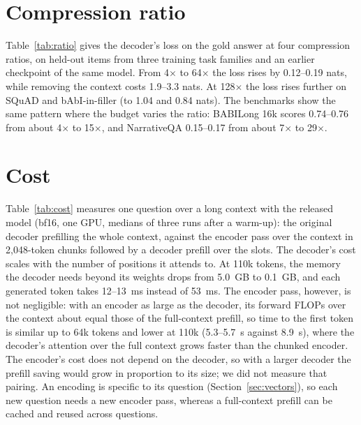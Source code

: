 \documentclass[11pt]{article}
\begin{document}
\begin{table}[!ht]
\centering
\small
\resizebox{\linewidth}{!}{}
\caption{Encoder conditions, same items and checkpoint as Table~\ref{tab:ratio}. EM: exact match of
generated answers at 64$\times$. $\mathcal{L}$: decoder loss on the gold answer (nats per token) at
4$\times$ and 64$\times$; lower is better. ``No context'' is the decoder's loss with the context
removed.}
\label{tab:ablation}
\end{table}

\section{Compression ratio}
\label{sec:ratio}

Table~\ref{tab:ratio} gives the decoder's loss on the gold answer at four compression ratios, on
held-out items from three training task families and an earlier checkpoint of the same model. From
4$\times$ to 64$\times$ the loss rises by 0.12--0.19 nats, while removing the context costs 1.9--3.3
nats. At 128$\times$ the loss rises further on SQuAD and bAbI-in-filler (to 1.04 and 0.84 nats). The
benchmarks show the same pattern where the budget varies the ratio: BABILong 16k scores 0.74--0.76 from
about 4$\times$ to 15$\times$, and NarrativeQA 0.15--0.17 from about 7$\times$ to 29$\times$.

\begin{table}[!ht]
\centering
\small

\caption{Decoder loss on the gold answer (nats per token) by compression ratio: held-out items of
three training task families (96 each), earlier checkpoint, question as the encoder prompt.}
\label{tab:ratio}
\end{table}

\section{Cost}
\label{sec:cost}

Table~\ref{tab:cost} measures one question over a long context with the released model (bf16, one
GPU, medians of three runs after a warm-up): the original decoder prefilling the whole context, against
the encoder pass over the context in 2{,}048-token chunks followed by a decoder prefill over the slots.
The decoder's cost scales with the number of positions it attends to. At 110k tokens, the memory the
decoder needs beyond its weights drops from 5.0~GB to 0.1~GB, and each generated token takes 12--13~ms
instead of 53~ms. The encoder pass, however, is not negligible: with an encoder as large as the decoder, its forward
FLOPs over the context about equal those of the full-context prefill, so time to the first token is
similar up to 64k tokens and lower at 110k (5.3--5.7~s against 8.9~s), where the decoder's attention
over the full context grows faster than the chunked encoder. The encoder's cost does not depend on the
decoder, so with a larger decoder the prefill saving would grow in proportion to its size; we did not
measure that pairing. An encoding is specific to its question (Section~\ref{sec:vectors}), so each new
question needs a new encoder pass, whereas a full-context prefill can be cached and reused across
questions.
\end{document}
